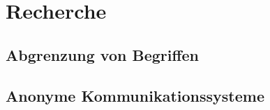 \section{Recherche}

\subsection{Abgrenzung von Begriffen}

\subsection{Anonyme Kommunikationssysteme}